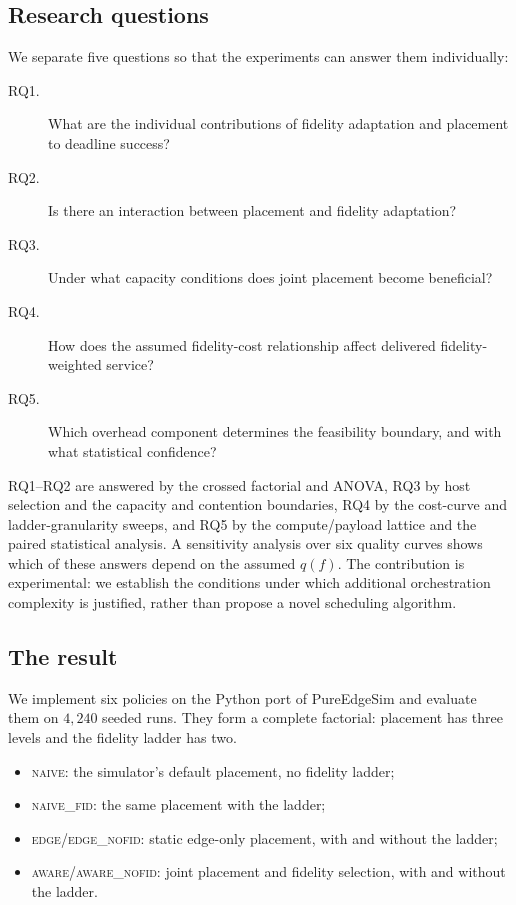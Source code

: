 \documentclass[journal,10pt]{IEEEtran}
\begin{document}
\subsection{Research questions}
We separate five questions so that the experiments can answer them individually:
\begin{description}
\item[RQ1.] What are the individual contributions of fidelity adaptation and
  placement to deadline success?
\item[RQ2.] Is there an interaction between placement and fidelity adaptation?
\item[RQ3.] Under what capacity conditions does joint placement become beneficial?
\item[RQ4.] How does the assumed fidelity-cost relationship affect delivered
  fidelity-weighted service?
\item[RQ5.] Which overhead component determines the feasibility boundary, and
  with what statistical confidence?
\end{description}
RQ1--RQ2 are answered by the crossed factorial and ANOVA, RQ3 by host selection
and the capacity and contention boundaries, RQ4 by the cost-curve and
ladder-granularity sweeps, and RQ5 by the compute/payload lattice and the paired
statistical analysis. A sensitivity analysis over six quality curves shows which
of these answers depend on the assumed $q(f)$. The contribution is
experimental: we establish the conditions under which additional orchestration
complexity is justified, rather than propose a novel scheduling algorithm.

\subsection{The result}
We implement six policies on the Python port of PureEdgeSim and evaluate them
on $4{,}240$ seeded runs. They form a complete factorial: placement has three
levels and the fidelity ladder has two.

\begin{itemize}
\item \textsc{naive}: the simulator's default placement, no fidelity ladder;
\item \textsc{naive\_fid}: the same placement with the ladder;
\item \textsc{edge}/\textsc{edge\_nofid}: static edge-only placement, with and
  without the ladder;
\item \textsc{aware}/\textsc{aware\_nofid}: joint placement and fidelity
  selection, with and without the ladder.
\end{itemize}
\end{document}
